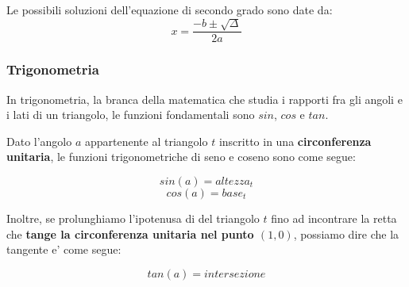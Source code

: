 \documentclass{article}
\begin{document}
{{    Le possibili soluzioni dell'equazione di secondo grado sono date da:
    $$ x = \frac{-b \pm \sqrt{\Delta}}{2a} $$

    \pagebreak

    \subsubsection{Trigonometria}
    In trigonometria, la branca della matematica che studia i rapporti fra gli angoli e i lati di un triangolo, le funzioni fondamentali sono $ sin $, $ cos $ e $ tan $.

    Dato l'angolo $ a $ appartenente al triangolo $ t $ inscritto in una \textbf{circonferenza unitaria}, le funzioni trigonometriche di seno e coseno sono come segue:

    $$ sin(a) = altezza_t $$
    $$ cos(a) = base_t $$

    Inoltre, se prolunghiamo l'ipotenusa di del triangolo $ t $ fino ad incontrare la retta che \textbf{tange la circonferenza unitaria nel punto $ (1,0) $}, possiamo dire che la tangente e' come segue:


    $$ tan(a) = intersezione $$

    \usetikzlibrary{angles,quotes}
    \newcommand\Base[1][0]{
      \begin{scope}[xshift=#1]
        \clip
          (-0.5,5.5) rectangle (5.5,-0.5);
          \draw[->]
          (-0.5,0) -- (5,0) node[right] {$x$};
        \draw[->]
          (0,-0.5) -- (0,5) node[above] {$y$};
        \coordinate (O) at (0,0);
        \coordinate (aux1) at (40:4);
        \coordinate (aux2) at (aux1|-0,0);
        \coordinate (aux3) at (4,{4*tan(40)});
        \draw
          (O) -- (aux3) -- (aux3|-0,0)
          (aux1) -- (aux2);
        \draw[thick,red!70!black] 
          (O) circle (4);
        \pic[draw,"$a$",angle radius=30pt,angle eccentricity=1.2] {angle = aux2--O--aux1};   
      \end{scope}  
    }


}}
\end{document}
